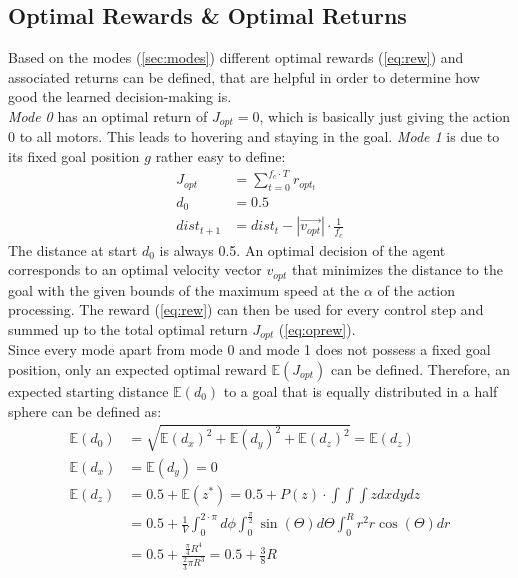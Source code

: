 \subsection{Optimal Rewards \& Optimal Returns}\label{sec:oprew}
Based on the modes (\cref{sec:modes}) different optimal rewards (\cref{eq:rew}) and associated returns can be defined, 
that are helpful in order to determine how good the learned decision-making is.\\
\emph{Mode 0} has an optimal return of $J_{opt} = 0$, which is basically just giving the action $0$ to all motors. 
This leads to hovering and staying in the goal.
\emph{Mode 1} is due to its fixed goal position $g$ rather easy to define:
\begin{align}
J_{opt} &= \sum_{t=0}^{f_c \cdot T}  r_{opt_t} \label{eq:oprew}\\
d_0 &= 0.5\\
dist_{t+1} &= dist_t - |\overrightarrow{v_{opt}}| \cdot \frac{1}{f_c} \label{eq:dt1}%
\end{align}
The distance at start $d_0$ is always 0.5. An optimal decision of the agent corresponds to an optimal velocity vector $v_{opt}$ that minimizes 
the distance to the goal with the given bounds of the maximum speed at the $\alpha$ of the action processing. 
The reward (\cref{eq:rew}) can then be used for every control step and summed up to the total optimal return $J_{opt}$ (\cref{eq:oprew}).\\
Since every mode apart from mode 0 and mode 1 does not possess a fixed goal position, only an expected optimal reward $\mathbb{E}(J_{opt})$ can be defined. 
Therefore, an expected starting distance $\mathbb{E}(d_0)$ to a goal that is equally distributed in a half sphere can be defined as:
\begin{align}
	\mathbb{E}(d_0) &= \sqrt{\mathbb{E}(d_x)^2 + \mathbb{E}(d_y)^2 + \mathbb{E}(d_z)^2}  = \mathbb{E}(d_z) \\
	\mathbb{E}(d_x) &= \mathbb{E}(d_y) = 0\\
	\mathbb{E}(d_z) &= 0.5 + \mathbb{E}(z^*) = 0.5 + P(z) \cdot \int \int \int  z dx dy dz \nonumber \\
	&= 0.5 + \frac{1}{V} \int_{0}^{2 \cdot \pi} d \phi \int_{0}^{\frac{\pi}{2}} \sin(\Theta) d\Theta \int_{0}^{R} r^2 r \cos(\Theta)  dr  \nonumber \\
	&= 0.5 + \frac{\frac{\pi}{4} R^4}{\frac{2}{3} \pi R^3} = 0.5 + \frac{3}{8} R
\end{align}
